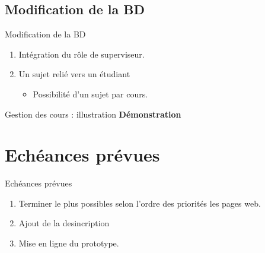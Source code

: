 \documentclass[numbering=fraction]{beamer}
\begin{document}
\subsection{Modification de la BD}
\begin{frame}{Modification de la BD}
    \begin{enumerate}
        \item Intégration du rôle de superviseur.
        \item Un sujet relié vers un étudiant
        \begin{itemize}
            \item Possibilité d'un sujet par cours.
        \end{itemize}
    \end{enumerate}
\end{frame}
\begin{frame}{Gestion des cours : illustration}
    \centering %
\vfill %
\textbf{\Large Démonstration} %
\vfill %
    \end{frame}
\section{Echéances prévues}
\begin{frame}{Echéances prévues}
    \begin{enumerate}
        \item Terminer le plus possibles selon l'ordre des priorités les pages web.
        \item Ajout de la desincription  
        \item Mise en ligne du prototype.  
    \end{enumerate}
\end{frame}
\end{document}
